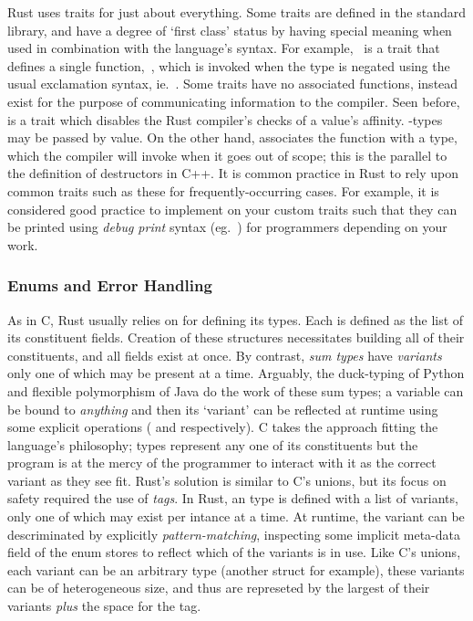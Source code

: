 Rust uses traits for just about everything. Some traits are defined in the standard library, and have a degree of `first class' status by having special meaning when used in combination with the language's syntax. For example,~ is a trait that defines a single function,~, which is invoked when the type is negated using the usual exclamation syntax, ie.\ . Some traits have no associated functions, instead exist for the purpose of communicating information to the compiler. Seen before,~ is a trait which disables the Rust compiler's checks of a value's affinity. -types may be passed by value. On the other hand,  associates the  function with a type, which the compiler will invoke when it goes out of scope; this is the parallel to the definition of destructors in C++. It is common practice in Rust to rely upon common traits such as these for frequently-occurring cases. For example, it is considered good practice to implement  on your custom traits such that they can be printed using \textit{debug print} syntax (eg.\ ) for programmers depending on your work.

\subsubsection{Enums and Error Handling}
As in C, Rust usually relies on  for defining its types. Each is defined as the list of its constituent fields. Creation of these structures necessitates building all of their constituents, and all fields exist at once. By contrast, \textit{sum types} have \textit{variants} only one of which may be present at a time. Arguably, the duck-typing of Python and flexible polymorphism of Java do the work of these sum types; a variable can be bound to \textit{anything} and then its `variant' can be reflected at runtime using some explicit operations ( and  respectively). C takes the approach fitting the language's philosophy;  types represent any one of its constituents but the program is at the mercy of the programmer to interact with it as the correct variant as they see fit. Rust's solution is similar to C's unions, but its focus on safety required the use of \textit{tags}. In Rust, an  type is defined with a list of variants, only one of which may exist per intance at a time. At runtime, the variant can be descriminated by explicitly \textit{pattern-matching}, inspecting some implicit meta-data field of the enum stores to reflect which of the variants is in use. Like C's unions, each variant can be an arbitrary type (another struct for example), these variants can be of heterogeneous size, and thus are represeted by the largest of their variants \textit{plus} the space for the tag. 

